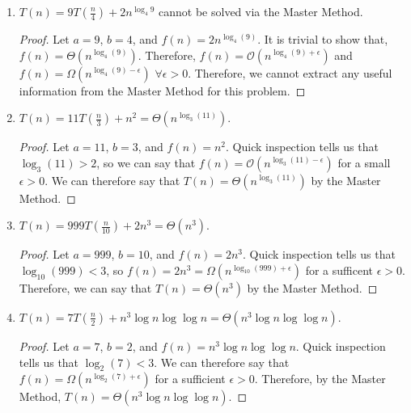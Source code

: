 \documentclass[11pt]{article}
\begin{document}
\begin{enumerate}
\begin{enumerate}
\begin{proof}
\begin{align*}
\lim_{n \to \infty} \frac{f(n)}{g(n)} = \lim_{n \to \infty} \frac{\frac{n}{\log \log n}}{n^{1-\epsilon}}= \lim_{n \to \infty} \frac{n^{\epsilon}}{\log \log n} = \infty.
\end{align*}
So, we can say that $f(n) = \Omega(n^{1-\epsilon}) \text{ } \forall \epsilon>0$.  For the same conditions on $\epsilon$, we can say that $f(n) = \mathcal{O}(n^{1+\epsilon})$.
Therefore we cannot extract any useful information about this recurrence from the Master Method.
\end{proof}
\item $T(n) =  9 T\left(\frac{n}{4}\right) + 2n^{\log_4 9}$ cannot be solved via the Master Method.
\begin{proof}
Let $a = 9$, $b=4$, and $f(n) = 2n^{\log_4(9)}$.  It is trivial to show that, $f(n) = \Theta\left(n^{\log_4(9)}\right)$.  Therefore, $f(n) = \mathcal{O}(n^{\log_4(9) + \epsilon})$ and $f(n) = \Omega(n^{\log_4(9) - \epsilon})$ $\forall \epsilon>0$.  Therefore, we cannot extract any useful information from the Master Method for this problem. 
\end{proof}
\item $T(n) =  11 T\left(\frac{n}{3}\right) + n^2 = \Theta\left(n^{\log_3(11)}\right)$.
\begin{proof}
Let $a = 11$, $b=3$, and $f(n) = n^2$.  Quick inspection tells us that $\log_3(11)>2$, so we can say that $f(n) = \mathcal{O}\left(n^{\log_3(11)-\epsilon}\right)$ for a small $\epsilon>0$. We can therefore say that $T(n) = \Theta\left(n^{\log_3(11)}\right)$ by the Master Method.
\end{proof}
\item $T(n) = 999 T\left(\frac{n}{10}\right) + 2n^3 = \Theta(n^3)$.
\begin{proof}
Let $a = 999$, $b = 10$, and $f(n) = 2n^3$.  Quick inspection tells us that 
$\log_10(999)<3$, so $f(n) = 2n^3 = \Omega(n^{\log_{10}(999)+ \epsilon})$ for a sufficent $\epsilon>0$.  Therefore, we can say that $T(n) = \Theta(n^3)$ by the Master Method.
\end{proof}
\item $T(n) =  7 T\left(\frac{n}{2}\right) + n^3 \log n \log \log n = \Theta(n^3 \log n \log \log n)$.
\begin{proof}
Let $a= 7$, $b=2$, and $f(n) = n^3 \log n \log \log n$.  Quick inspection tells us that $\log_2(7) < 3$.  We can therefore say that $f(n)= \Omega(n^{\log_2(7)+ \epsilon})$ for a sufficient $\epsilon>0$.  Therefore, by the Master Method, $T(n) = \Theta(n^3 \log n \log \log n)$.
\end{proof}

\end{enumerate}
\end{enumerate}
\end{document}
